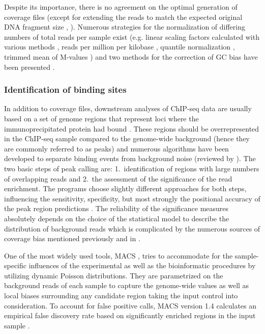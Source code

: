 Despite its importance, there is no agreement on the optimal generation of coverage files (except for extending the reads to match the expected original DNA fragment size \citep{Pepke2009, Leleu2010}, ). Numerous strategies for the normalization of differing numbers of total reads per sample exist (e.g. linear scaling factors calculated with various methods \citep{Kharchenko2008b, Rozowsky2009, Diaz2012}, reads per million per kilobase \citep{Mortazavi2008}, quantile normalization \citep{Mendoza2012}, trimmed mean of M-values \citep{Robinson2010}) and two methods for the correction of GC bias have been presented \citep{Cheung2011, Benjamini2012}.
%
\subsubsection{Identification of binding sites}
In addition to coverage files, downstream analyses of ChIP-seq data are usually based on a set of genome regions that represent loci where the immunoprecipitated protein had bound \citep{Park2009,Liu2010, Bailey2013}. These regions should be overrepresented in the ChIP-seq sample compared to the genome-wide background (hence they are commonly referred to as peaks) and numerous algorithms have been developed to separate binding events from background noise (reviewed by \citet{Pepke2009}). The two basic steps of peak calling are: 1.~identification of regions with large numbers of overlapping reads and 2.~the assessment of the significance of the read enrichment.
The programs choose slightly different approaches for both steps, influencing the sensitivity, specificity, but most strongly the positional accuracy of the peak region predictions \citep{Wilbanks2010}. The reliability of the significance measures absolutely depends on the choice of the statistical model to describe the distribution of background reads which is complicated by the numerous sources of coverage bias mentioned previously and in . 

One of the most widely used tools, MACS \citep{Zhang2008}, tries to accommodate for the sample-specific influences of the experimental as well as the bioinformatic procedures by utilizing dynamic Poisson distributions. They are parametrized on the background reads of each sample to capture the genome-wide values as well as local biases surrounding any candidate region taking the input control into consideration. To account for false positive calls, MACS version 1.4 calculates an empirical false discovery rate based on significantly enriched regions in the input sample \citep{Zhang2008, Feng2012}. 

